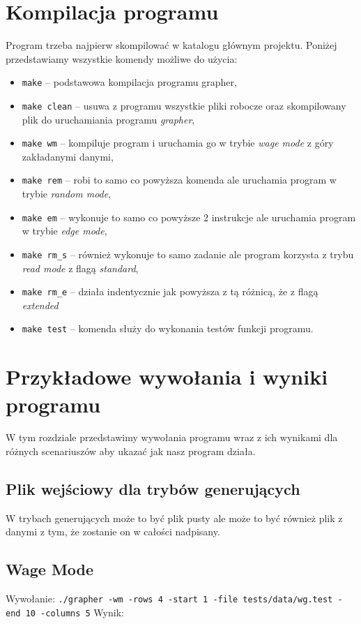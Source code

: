 \documentclass[10pt, a4paper]{report}
\begin{document}
    \section{Kompilacja programu}
    Program trzeba najpierw skompilować w katalogu głównym projektu. Poniżej przedstawiamy wszystkie komendy możliwe do użycia:
    \begin{itemize}
        \item \texttt{make} -- podstawowa kompilacja programu grapher,
        \item \texttt{make clean} -- usuwa z programu wszystkie pliki robocze oraz skompilowany plik do uruchamiania programu \textit{grapher},
        \item \texttt{make wm} -- kompiluje program i uruchamia go w trybie \textit{wage mode} z góry zakładanymi danymi,
        \item \texttt{make rem} -- robi to samo co powyższa komenda ale uruchamia program w trybie \textit{random mode},
        \item \texttt{make em} -- wykonuje to samo co powyższe 2 instrukcje ale uruchamia program w trybie \textit{edge mode},
        \item \texttt{make rm\_s} -- również wykonuje to samo zadanie ale program korzysta z trybu \textit{read mode} z flagą \textit{standard},
        \item \texttt{make rm\_e} -- działa indentycznie jak powyższa z tą różnicą, że z flagą \textit{extended}
        \item \texttt{make test} -- komenda służy do wykonania testów funkcji programu.
    \end{itemize}

    \section{Przykładowe wywołania i wyniki programu}
    W tym rozdziale przedstawimy wywołania programu wraz z ich wynikami dla różnych scenariuszów aby ukazać jak nasz program działa.

    \subsection{Plik wejściowy dla trybów generujących}
    W trybach generujących może to być plik pusty ale może to być również plik z danymi z tym, że zostanie on w całości nadpisany.

    \subsection{Wage Mode}
    Wywołanie:
    \newline\newline \texttt{./grapher -wm -rows 4 -start 1 -file tests/data/wg.test -end 10 -columns 5}
    \newline\newline Wynik:
    
\end{document}
